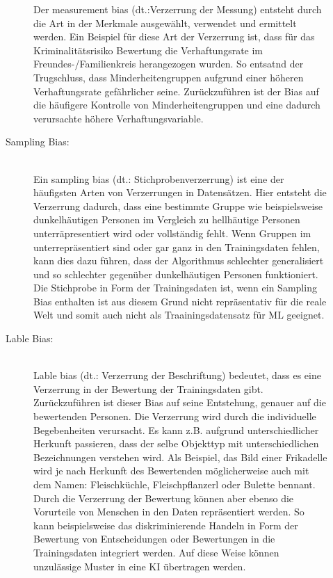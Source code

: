\begin{onehalfspace}
\begin{description}
\begin{description}
                Der \glqq{}measurement bias\grqq{} (\ac*{dt}.:Verzerrung der Messung) entsteht durch die Art in der Merkmale ausgewählt, verwendet und ermittelt werden. Ein Beispiel für diese Art der Verzerrung ist, dass für das Kriminalitätsrisiko Bewertung die Verhaftungsrate im Freundes-/Familienkreis herangezogen wurden. So entsatnd der Trugschluss, dass Minderheitengruppen aufgrund einer höheren Verhaftungsrate gefährlicher seine. Zurückzuführen ist der Bias auf die häufigere Kontrolle von Minderheitengruppen und eine dadurch verursachte höhere Verhaftungsvariable.\cite{silberg2019notes}\cite{srinivasan2021biases}\cite{Mehrabi2021}
                \item [Sampling Bias:] \hfill \\
                Ein \glqq{}sampling bias\grqq{} (\ac*{dt}.: Stichprobenverzerrung) ist eine der häufigsten Arten von Verzerrungen in Datensätzen. Hier entsteht die Verzerrung dadurch, dass eine bestimmte Gruppe wie beispielsweise dunkelhäutigen Personen im Vergleich zu hellhäutige Personen unterräpresentiert wird oder vollständig fehlt. Wenn Gruppen im unterrepräsentiert sind oder gar ganz in den Trainingsdaten fehlen, kann dies dazu führen, dass der Algorithmus schlechter generalisiert und so schlechter gegenüber dunkelhäutigen Personen funktioniert. Die Stichprobe in Form der Trainingsdaten ist, wenn ein Sampling Bias enthalten ist aus diesem Grund nicht repräsentativ für die reale Welt und somit auch nicht als Traainingsdatensatz für \ac*{ML} geeignet.\cite{srinivasan2021biases}\cite{Mehrabi2021}
                \item [Lable Bias:] \hfill \\
                \glqq{}Lable bias\grqq{} (\ac*{dt}.: Verzerrung der Beschriftung) bedeutet, dass es eine Verzerrung in der Bewertung der Trainingsdaten gibt. Zurückzuführen ist dieser Bias auf seine Entstehung, genauer auf die bewertenden Personen. Die Verzerrung wird durch die individuelle Begebenheiten verursacht. Es kann z.B. aufgrund unterschiedlicher Herkunft passieren, dass der selbe Objekttyp mit unterschiedlichen Bezeichnungen verstehen wird. Als Beispiel, das Bild einer Frikadelle wird je nach Herkunft des Bewertenden möglicherweise auch mit dem Namen: Fleischküchle, Fleischpflanzerl oder Bulette bennant.
                Durch die Verzerrung der Bewertung können aber ebenso die Vorurteile von Menschen in den Daten repräsentiert werden. So kann beispielsweise das diskriminierende Handeln in Form der Bewertung von Entscheidungen oder Bewertungen in die Trainingsdaten integriert werden. Auf diese Weise können unzulässige Muster in eine \ac*{KI} übertragen werden.\cite{srinivasan2021biases}
            \end{description}
            

\end{description}
\end{onehalfspace}
